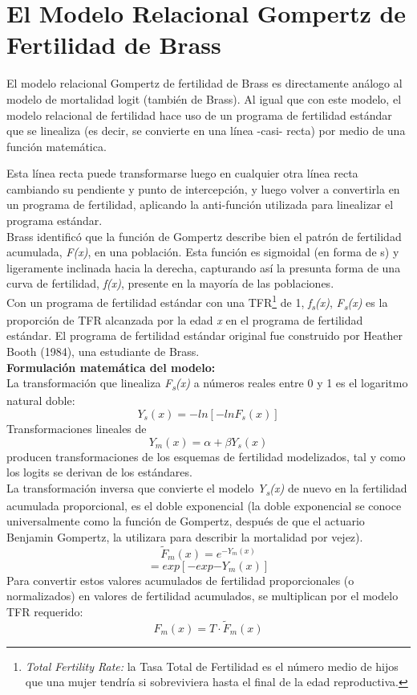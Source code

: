 
\chapter{El Modelo Relacional Gompertz de Fertilidad de Brass} %

\label{AppendixB} %

El modelo relacional Gompertz de fertilidad de Brass es directamente análogo al modelo de mortalidad logit (también de Brass). Al igual que con este modelo, el modelo relacional de fertilidad hace uso de un programa de fertilidad estándar que se linealiza (es decir, se convierte en una línea -casi- recta) por medio de una función matemática.

Esta línea recta puede transformarse luego en cualquier otra línea recta cambiando su pendiente y punto de intercepción, y luego volver a convertirla en un programa de fertilidad, aplicando la anti-función utilizada para linealizar el programa estándar.\\

Brass identificó que la función de Gompertz describe bien el patrón de fertilidad acumulada, \textit{F(x)}, en una población. Esta función es sigmoidal (en forma de s) y ligeramente inclinada hacia la derecha, capturando así la presunta forma de una curva de fertilidad, \textit{f(x)}, presente en la mayoría de las poblaciones.\\

Con un programa de fertilidad estándar con una TFR\footnote{\textit{Total Fertility Rate:} la Tasa Total de Fertilidad es el número medio de hijos que una mujer tendría si sobreviviera hasta el final de la edad reproductiva.} de 1, \textit{f\textsubscript{s}(x)}, \textit{F\textsubscript{s}(x)} es la proporción de TFR alcanzada por la edad \textit{x} en el programa de fertilidad estándar. El programa de fertilidad estándar original fue construido por Heather Booth (1984), una estudiante de Brass.\\

\textbf{Formulación matemática del modelo:}\\

\noindent La transformación que linealiza \textit{F\textsubscript{s}(x)} a números reales entre 0 y 1 es el logaritmo natural doble: $$Y_{s}(x)=-ln[-ln F_{s}(x)]$$ Transformaciones lineales de  $$Y_{m}(x)=\alpha + \beta Y_{s}(x)$$ producen transformaciones de los esquemas de fertilidad modelizados, tal y como los logits se derivan de los estándares.\\
La transformación inversa que convierte el modelo \textit{Y\textsubscript{s}(x)} de nuevo en la fertilidad acumulada proporcional, es el doble exponencial (la doble exponencial se conoce universalmente como la función de Gompertz, después de que el actuario Benjamin Gompertz, la utilizara para describir la mortalidad por vejez). $$\widetilde{F}_{m}(x)=e^{-Y_{m}(x)}$$ $$=exp[-exp{-Y_{m}(x)}]$$ Para convertir estos valores acumulados de fertilidad proporcionales (o normalizados) en valores de fertilidad acumulados, se multiplican por el modelo TFR requerido: $$F_{m}(x)=T\cdot\widetilde{F}_{m}(x)$$

